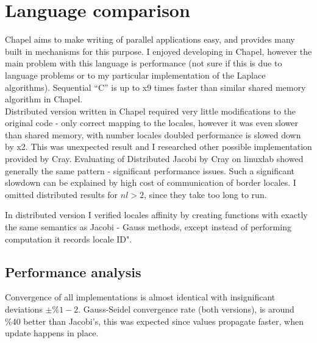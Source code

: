 \documentclass{article}
\begin{document}
\section{Language comparison}

Chapel aims to make writing of parallel applications easy, and provides many built in
mechanisms for this purpose. I enjoyed developing in Chapel, however the main problem with
this language is performance (not sure if this is due to language problems or to my
particular implementation of the Laplace algorithms). Sequential ``C'' is up to x9 times
faster than similar shared memory algorithm in Chapel. \\

Distributed version written in Chapel required very little modifications to the original
code - only correct mapping to the locales, however it was even slower than shared memory,
with number locales doubled performance is slowed down by x2. This was unexpected result and
I researched other possible implementation provided by Cray. Evaluating of Distributed
Jacobi by Cray on linuxlab showed generally the same pattern - significant performance
issues. Such a significant slowdown can be explained by high cost of communication of border
locales. I omitted distributed results for $nl > 2$, since they take too long to run.

In distributed version I verified locales affinity by creating functions with exactly the
same semantics as Jacobi - Gauss methods, except instead of performing computation it records
locale ID".

\subsection{Performance analysis}

Convergence of all implementations is almost identical with insignificant deviations $\pm
\%1- 2$.
Gauss-Seidel convergence rate (both versions), is around \%40 better than Jacobi's, this was
expected since values propagate faster, when update happens in place.

\end{document}
